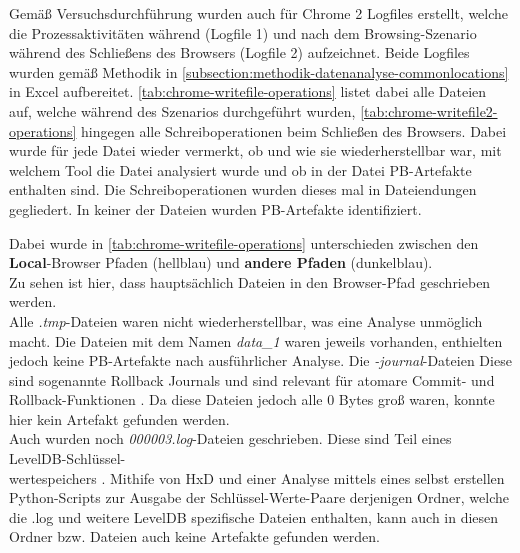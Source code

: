 \begin{appendices}
Gemäß Versuchsdurchführung wurden auch für Chrome 2 Logfiles erstellt, welche die Prozessaktivitäten während (Logfile 1) und nach dem Browsing-Szenario während des Schließens des Browsers (Logfile 2) aufzeichnet. Beide Logfiles wurden gemäß Methodik in \autoref{subsection:methodik-datenanalyse-commonlocations} in Excel aufbereitet. \autoref{tab:chrome-writefile-operations} listet dabei alle Dateien auf, welche während des Szenarios durchgeführt wurden, \autoref{tab:chrome-writefile2-operations} hingegen alle Schreiboperationen beim Schließen des Browsers. Dabei wurde für jede Datei wieder vermerkt, ob und wie sie wiederherstellbar war, mit welchem Tool die Datei analysiert wurde und ob in der Datei PB-Artefakte enthalten sind. Die Schreiboperationen wurden dieses mal in Dateiendungen gegliedert. In keiner der Dateien wurden PB-Artefakte identifiziert.

Dabei wurde in \autoref{tab:chrome-writefile-operations} unterschieden zwischen den \textbf{Local}-Browser Pfaden (hellblau) und \textbf{andere Pfaden} (dunkelblau).\\
Zu sehen ist hier, dass hauptsächlich Dateien in den Browser-Pfad geschrieben werden.\\
Alle \textit{.tmp}-Dateien waren nicht wiederherstellbar, was eine Analyse unmöglich macht. Die Dateien mit dem Namen \textit{data\_1} waren jeweils vorhanden, enthielten jedoch keine PB-Artefakte nach ausführlicher Analyse. Die \textit{-journal}-Dateien Diese sind sogenannte \glqq{}Rollback Journals\grqq{} und sind relevant für atomare Commit- und Rollback-Funktionen \cite{SQLiteTempfiles}. Da diese Dateien jedoch alle 0 Bytes groß waren, konnte hier kein Artefakt gefunden werden.\\
Auch wurden noch \textit{000003.log}-Dateien geschrieben. Diese sind Teil eines LevelDB-Schlüssel-\\wertespeichers \cite{LevelDBGithub,LevelDBCCL} . Mithife von HxD und einer Analyse mittels eines selbst erstellen Python-Scripts zur Ausgabe der Schlüssel-Werte-Paare derjenigen Ordner, welche die .log und weitere LevelDB spezifische Dateien enthalten, kann auch in diesen Ordner bzw. Dateien auch keine Artefakte gefunden werden.\\


\end{appendices}
